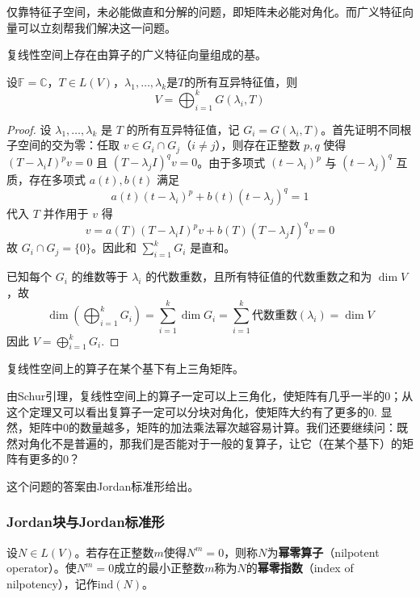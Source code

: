 仅靠特征子空间，未必能做直和分解的问题，即矩阵未必能对角化。而广义特征向量可以立刻帮我们解决这一问题。
\begin{theorem}
复线性空间上存在由算子的广义特征向量组成的基。
\end{theorem}

\begin{theorem}[根子空间分解]
设$\mathbb{F}=\mathbb{C}$，$T \in L(V)$，$\lambda_1, \ldots, \lambda_k$是$T$的所有互异特征值，则
\[
V = \bigoplus_{i=1}^k G(\lambda_i, T)
\]
\end{theorem}

\begin{proof}
设 $\lambda_1, \ldots, \lambda_k$ 是 $T$ 的所有互异特征值，记 $G_i = G(\lambda_i, T)$。首先证明不同根子空间的交为零：任取 $v \in G_i \cap G_j$（$i \neq j$），则存在正整数 $p, q$ 使得 $(T - \lambda_i I)^p v = 0$ 且 $(T - \lambda_j I)^q v = 0$。由于多项式 $(t - \lambda_i)^p$ 与 $(t - \lambda_j)^q$ 互质，存在多项式 $a(t), b(t)$ 满足
\[
a(t)(t - \lambda_i)^p + b(t)(t - \lambda_j)^q = 1
\]
代入 $T$ 并作用于 $v$ 得
\[
v = a(T)(T - \lambda_i I)^p v + b(T)(T - \lambda_j I)^q v = 0
\]
故 $G_i \cap G_j = \{0\}$。因此和 $\sum_{i=1}^k G_i$ 是直和。

已知每个 $G_i$ 的维数等于 $\lambda_i$ 的代数重数，且所有特征值的代数重数之和为 $\dim V$，故
\[
\dim\left(\bigoplus_{i=1}^k G_i\right) = \sum_{i=1}^k \dim G_i = \sum_{i=1}^k \text{代数重数}(\lambda_i) = \dim V
\]
因此 $V = \bigoplus_{i=1}^k G_i$.
\end{proof}

\begin{claim}[Schur引理]
    复线性空间上的算子在某个基下有上三角矩阵。
\end{claim}

由Schur引理，复线性空间上的算子一定可以上三角化，使矩阵有几乎一半的0；从这个定理又可以看出复算子一定可以分块对角化，使矩阵大约有了更多的0. 显然，矩阵中0的数量越多，矩阵的加法乘法幂次越容易计算。我们还要继续问：既然对角化不是普遍的，那我们是否能对于一般的复算子，让它（在某个基下）的矩阵有更多的0？

这个问题的答案由Jordan标准形给出。

\subsubsection{Jordan块与Jordan标准形}
\begin{definition}[幂零算子]
设$N \in L(V)$。若存在正整数$m$使得$N^m = 0$，则称$N$为\textbf{幂零算子}（nilpotent operator）。使$N^m = 0$成立的最小正整数$m$称为$N$的\textbf{幂零指数}（index of nilpotency），记作$\mathrm{ind}(N)$。
\end{definition}

